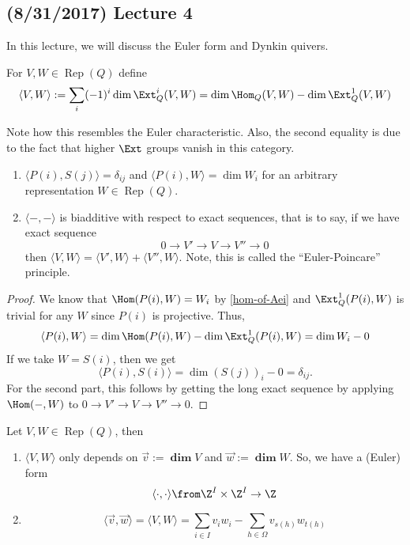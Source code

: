 \documentclass[11pt,leqno,oneside]{amsbook}
\numberwithin{thm}{section}
\newcommand{\Rep}{\operatorname{Rep}} %
\renewcommand{\Q}{Q} %
\newcommand{\grdim}{\boldsymbol{\dim}} %
\begin{document}
\subsection*{(8/31/2017) Lecture 4}
In this lecture, we will discuss the Euler form and Dynkin quivers.
\begin{defn}
  For \(V,W \in \Rep(\Q)\) define \[
    \langle V,W \rangle := \sum_i (-1)^i \dim \Ext_Q^i(V,W) = \dim
    \Hom_Q(V,W) - \dim \Ext_Q^1(V,W)
  \]
\end{defn}
Note how this resembles the Euler characteristic. Also, the second
equality is due to the fact that higher \(\Ext\) groups vanish in this
category.
\begin{prop}
  \begin{enumerate}
  \item \(\langle P(i), S(j) \rangle = \delta_{ij}\) and \(\langle
    P(i), W \rangle = \dim W_i\) for an arbitrary representation \(W
    \in \Rep(\Q)\).
  \item \(\langle -,- \rangle\) is biadditive with respect to exact
    sequences, that is to say, if we have exact sequence \[
      0 \to V' \to V \to V'' \to 0
    \]
    then \(\langle V,W \rangle = \langle V',W \rangle + \langle V'', W
    \rangle\). Note, this is called the ``Euler-Poincare'' principle.
  \end{enumerate}
\end{prop}
\begin{proof}
  We know that \(\Hom(P(i),W) = W_i\) by \ref{hom-of-Aei} and
  \(\Ext_\Q^1(P(i),W)\) is trivial for any \(W\) since \(P(i)\) is
  projective. Thus, \[
    \langle P(i),W \rangle = \dim \Hom(P(i),W) - \dim \Ext_Q^1(P(i),W) =
    \dim W_i - 0
  \]
  If we take \(W = S(i)\), then we get
  \[
    \langle P(i), S(i) \rangle = \dim (S(j))_i - 0 = \delta_{ij}.
  \]
  For the second part, this follows by getting the long exact sequence
  by applying \(\Hom(-,W)\) to \(0 \to V' \to V \to V'' \to 0\). 
\end{proof}
\begin{thm}
  Let \(V,W \in \Rep(\Q)\), then
  \begin{enumerate}
  \item \(\langle V,W \rangle\) only depends
  on \(\vec{v} := \grdim V\) and \(\vec{w} := \grdim W\). So, we have
  a (Euler) form \[
    \langle \cdot, \cdot \rangle \from \Z^I \times \Z^I \to \Z
  \]
\item \[
    \langle \vec{v}, \vec{w} \rangle = \langle V,W \rangle = \sum_{i
      \in I} v_i w_i - \sum_{h \in \Omega} v_{s(h)} w_{t(h)}
  \]
  \end{enumerate}
\end{thm}
\end{document}
